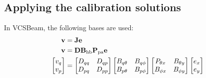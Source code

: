 \documentclass{book}
\newcommand{\vcsbeam}{{\sc VCSBeam}}
\newcommand{\pamat}{\ensuremath{{\bf P}_\text{pa}}}
\begin{document}
\subsection{Applying the calibration solutions}

In \vcsbeam{}, the following bases are used:
\begin{equation}
    \begin{aligned}
        {\bf v} &= {\bf J}{\bf e} \\
        {\bf v} &= {\bf D} {\bf B}_\text{hb} \pamat {\bf e} \\
        \begin{bmatrix} v_q \\ v_p \end{bmatrix}
            &= \begin{bmatrix} D_{qq} & D_{qp} \\ D_{pq} & D_{pp} \end{bmatrix}
               \begin{bmatrix} B_{q\theta} & B_{q\phi} \\ B_{p\theta} & B_{p\phi} \end{bmatrix}
               \begin{bmatrix} P_{\theta x} & B_{\theta y} \\ B_{\phi x} & B_{\phi y} \end{bmatrix}
               \begin{bmatrix} e_x \\ e_y \end{bmatrix}
    \end{aligned}
\end{equation}
\end{document}
